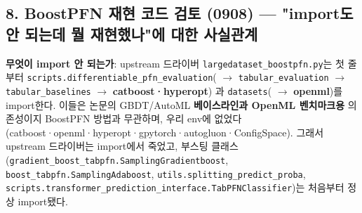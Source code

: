 \subsection{8. BoostPFN 재현 코드 검토 (0908) — "import도 안 되는데 뭘 재현했나"에 대한 사실관계}
\par\noindent \textbullet\enspace \textbf{무엇이 import 안 되는가}: upstream 드라이버 \texttt{largedat\allowbreak{}aset\_\allowbreak{}\allowbreak{}boo\allowbreak{}stpfn.\allowbreak{}py\allowbreak{}}는 첫 줄부터 \texttt{scripts.\allowbreak{}differen\allowbreak{}tiable\_\allowbreak{}\allowbreak{}p\allowbreak{}fn\_\allowbreak{}\allowbreak{}evalu\allowbreak{}ation}( \ensuremath{\rightarrow}  \texttt{tabular\_\allowbreak{}\allowbreak{}evaluati\allowbreak{}on}  \ensuremath{\rightarrow}  \texttt{tabular\_\allowbreak{}\allowbreak{}baseline\allowbreak{}s}  \ensuremath{\rightarrow}  \textbf{catboost·hyperopt}) 과 \texttt{datasets\allowbreak{}}( \ensuremath{\rightarrow}  \textbf{openml})를 import한다. 이들은 논문의 GBDT/\allowbreak{}AutoML \textbf{베이스라인과 OpenML 벤치마크용} 의존성이지 BoostPFN 방법과 무관하며, 우리 env에 없었다(catboost·openml·hyperopt·gpytorch·autogluon·ConfigSpace). 그래서 upstream 드라이버는 import에서 죽었고, 부스팅 클래스(\texttt{gradient\allowbreak{}\_\allowbreak{}\allowbreak{}boost\_\allowbreak{}\allowbreak{}t\allowbreak{}abpfn.\allowbreak{}Sa\allowbreak{}mplingGr\allowbreak{}adientbo\allowbreak{}ost}, \texttt{boost\_\allowbreak{}\allowbreak{}ta\allowbreak{}bpfn.\allowbreak{}Sam\allowbreak{}plingAda\allowbreak{}boost}, \texttt{utils.\allowbreak{}sp\allowbreak{}litting\_\allowbreak{}\allowbreak{}predict\_\allowbreak{}\allowbreak{}proba}, \texttt{scripts.\allowbreak{}transfor\allowbreak{}mer\_\allowbreak{}\allowbreak{}pred\allowbreak{}iction\_\allowbreak{}\allowbreak{}i\allowbreak{}nterface\allowbreak{}.\allowbreak{}TabPFNC\allowbreak{}lassifie\allowbreak{}r})는 처음부터 정상 import됐다.


